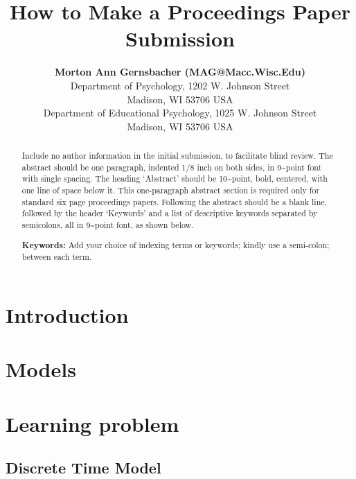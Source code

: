 \documentclass[10pt, letterpaper]{article}
\title{How to Make a Proceedings Paper Submission}
\author{{\large \bf Morton Ann Gernsbacher (MAG@Macc.Wisc.Edu)} \\ Department of Psychology, 1202 W. Johnson Street \\ Madison, WI 53706 USA \AND {\large \bf Sharon J.~Derry (SDJ@Macc.Wisc.Edu)} \\ Department of Educational Psychology, 1025 W. Johnson Street \\ Madison, WI 53706 USA}
\begin{document}
\maketitle

\begin{abstract}
Include no author information in the initial submission, to facilitate
blind review. The abstract should be one paragraph, indented 1/8 inch on
both sides, in 9\textasciitilde point font with single spacing. The
heading `Abstract' should be 10\textasciitilde point, bold, centered,
with one line of space below it. This one-paragraph abstract section is
required only for standard six page proceedings papers. Following the
abstract should be a blank line, followed by the header `Keywords' and a
list of descriptive keywords separated by semicolons, all in
9\textasciitilde point font, as shown below.

\textbf{Keywords:}
Add your choice of indexing terms or keywords; kindly use a semi-colon;
between each term.
\end{abstract}

\hypertarget{introduction}{%
\section{Introduction}\label{introduction}}

\hypertarget{models}{%
\section{Models}\label{models}}

\hypertarget{learning-problem}{%
\section{Learning problem}\label{learning-problem}}

\hypertarget{discrete-time-model}{%
\subsection{Discrete Time Model}\label{discrete-time-model}}
\end{document}
